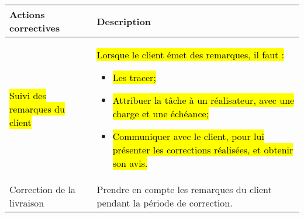 \begin{center}
\begin{tabular}{|m{5cm}|m{11cm}|}
\hline
\rowcolor[gray]{.8} Actions correctives & Description\\
\hline
\hl{Suivi des remarques du client} & \hl{Lorsque le client émet des remarques, il faut :}
\begin{itemize}
\item \hl{Les tracer;}
\item \hl{Attribuer la tâche à un réalisateur, avec une charge et une échéance;}
\item \hl{Communiquer avec le client, pour lui présenter les corrections réalisées, et obtenir son avis.}
\end{itemize} \\
\hline
Correction de la livraison & Prendre en compte les remarques du client pendant la période de correction. \\
\hline
\end{tabular}
\end{center}



